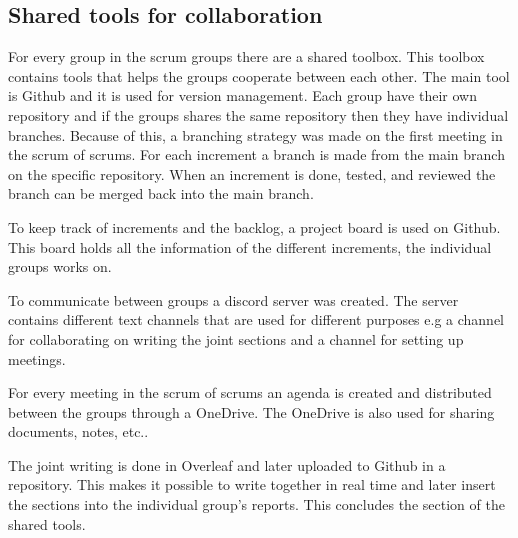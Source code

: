 \subsection{Shared tools for collaboration}\label{sub:shared-tools-for-collaboration}
For every group in the scrum groups there are a shared toolbox.
This toolbox contains tools that helps the groups cooperate between each other.
The main tool is Github and it is used for version management.  
Each group have their own repository and if the groups shares the same repository then they have individual branches.
Because of this, a branching strategy was made on the first meeting in the scrum of scrums.
For each increment a branch is made from the main branch on the specific repository. 
When an increment is done, tested, and reviewed the branch can be merged back into the main branch.

To keep track of increments and the backlog, a project board is used on Github.
This board holds all the information of the different increments, the individual groups works on.

To communicate between groups a discord server was created.
The server contains different text channels that are used for different purposes e.g a channel for collaborating on writing the joint sections and a channel for setting up meetings.

For every meeting in the scrum of scrums an agenda is created and distributed between the groups through a OneDrive.
The OneDrive is also used for sharing documents, notes, etc..

The joint writing is done in Overleaf and later uploaded to Github in a repository.
This makes it possible to write together in real time and later insert the sections into the individual group's reports.
This concludes the section of the shared tools.